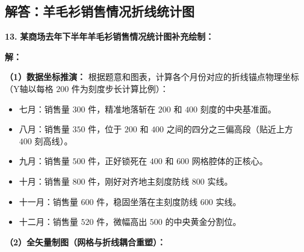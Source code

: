 ﻿%

\subsection{解答：羊毛衫销售情况折线统计图}

\vspace{0.6cm}

\textbf{\LARGE 13.} \textbf{某商场去年下半年羊毛衫销售情况统计图补充绘制：}

\vspace{0.6cm}
\textbf{解：}

\textbf{（1）数据坐标推演：}
根据题意和图表，计算各个月份对应的折线锚点物理坐标（Y轴以每格 $200$ 件为刻度步长计算比例）：
\begin{itemize}
    \item 七月：销售量 $300$ 件，精准地落斩在 $200$ 和 $400$ 刻度的中央基准面。
    \item 八月：销售量 $350$ 件，位于 $200$ 和 $400$ 之间的四分之三偏高段（贴近上方 $400$ 刻高线）。
    \item 九月：销售量 $500$ 件，正好锁死在 $400$ 和 $600$ 网格腔体的正核心。
    \item 十月：销售量 $800$ 件，刚好对齐地主刻度防线 $800$ 实线。
    \item 十一月：销售量 $600$ 件，稳固坐落在主刻度防线 $600$ 实线。
    \item 十二月：销售量 $520$ 件，微幅高出 $500$ 的中央黄金分割位。
\end{itemize}

\textbf{（2）全矢量制图（网格与折线耦合重塑）：}

